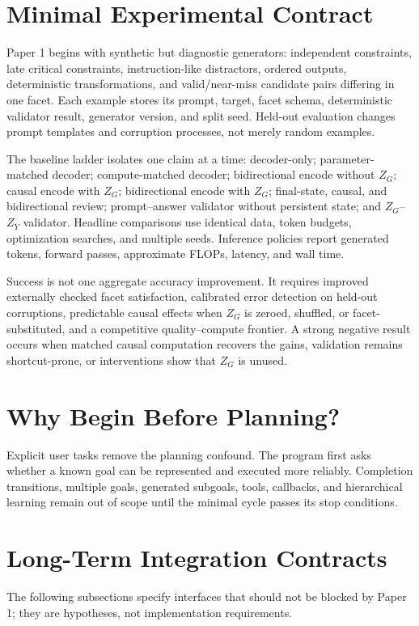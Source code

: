 \documentclass[11pt]{article}
\begin{document}
\section{Minimal Experimental Contract}
Paper 1 begins with synthetic but diagnostic generators: independent constraints, late critical constraints, instruction-like distractors, ordered outputs, deterministic transformations, and valid/near-miss candidate pairs differing in one facet. Each example stores its prompt, target, facet schema, deterministic validator result, generator version, and split seed. Held-out evaluation changes prompt templates and corruption processes, not merely random examples.

The baseline ladder isolates one claim at a time: decoder-only; parameter-matched decoder; compute-matched decoder; bidirectional encode without $Z_G$; causal encode with $Z_G$; bidirectional encode with $Z_G$; final-state, causal, and bidirectional review; prompt--answer validator without persistent state; and $Z_G$--$Z_Y$ validator. Headline comparisons use identical data, token budgets, optimization searches, and multiple seeds. Inference policies report generated tokens, forward passes, approximate FLOPs, latency, and wall time.

Success is not one aggregate accuracy improvement. It requires improved externally checked facet satisfaction, calibrated error detection on held-out corruptions, predictable causal effects when $Z_G$ is zeroed, shuffled, or facet-substituted, and a competitive quality--compute frontier. A strong negative result occurs when matched causal computation recovers the gains, validation remains shortcut-prone, or interventions show that $Z_G$ is unused.

\section{Why Begin Before Planning?}
Explicit user tasks remove the planning confound. The program first asks whether a known goal can be represented and executed more reliably. Completion transitions, multiple goals, generated subgoals, tools, callbacks, and hierarchical learning remain out of scope until the minimal cycle passes its stop conditions.

\section{Long-Term Integration Contracts}
The following subsections specify interfaces that should not be blocked by Paper 1; they are hypotheses, not implementation requirements.
\end{document}
